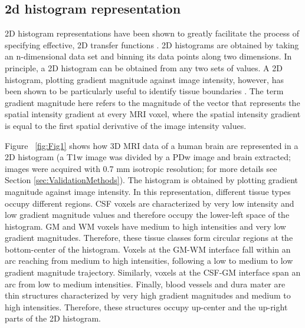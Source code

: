 \subsection{2d histogram representation}
2D histogram representations have been shown to greatly facilitate the process of specifying effective, 2D transfer functions \parencite{Kindlmann1998, Kniss2005}. 2D histograms are obtained by taking an n-dimensional data set and binning its data points along two dimensions. In principle, a 2D histogram can be obtained from any two sets of values. A 2D histogram, plotting gradient magnitude against image intensity, however, has been shown to be particularly useful to identify tissue boundaries \parencite{Kindlmann1998, Kniss2005}. The term gradient magnitude here refers to the magnitude of the vector that represents the spatial intensity gradient at every MRI voxel, where the spatial intensity gradient is equal to the first spatial derivative of the image intensity values.

Figure ~\ref{fig:Fig1} shows how 3D MRI data of a human brain are represented in a 2D histogram (a T1w image was divided by a PDw image \parencite{Moortele2009} and brain extracted; images were acquired with 0.7 mm isotropic resolution; for more details see Section \ref{sec:ValidationMethods}). The histogram is obtained by plotting gradient magnitude against image intensity. In this representation, different tissue types occupy different regions. CSF voxels are characterized by very low intensity and low gradient magnitude values and therefore occupy the lower-left space of the histogram. GM and WM voxels have medium to high intensities and very low gradient magnitudes. Therefore, these tissue classes form circular regions at the bottom-center of the histogram. Voxels at the GM-WM interface fall within an arc reaching from medium to high intensities, following a low to medium to low gradient magnitude trajectory. Similarly, voxels at the CSF-GM interface span an arc from low to medium intensities. Finally, blood vessels and dura mater are thin structures characterized by very high gradient magnitudes and medium to high intensities. Therefore, these structures occupy up-center and the up-right parts of the 2D histogram.


